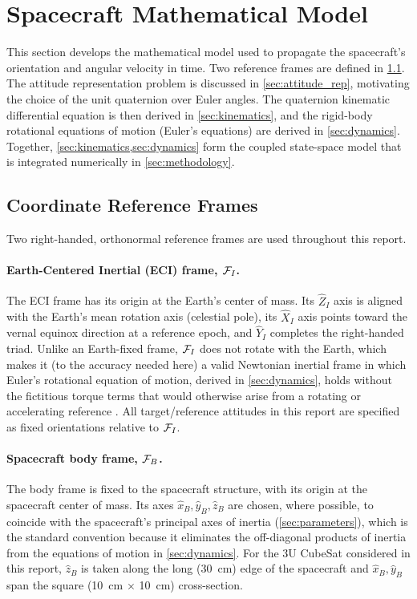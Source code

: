 \section{Spacecraft Mathematical Model}
\label{sec:math_model}

This section develops the mathematical model used to propagate the spacecraft's orientation and angular velocity in time. Two reference frames are defined in \cref{sec:frames}. The attitude representation problem is discussed in \cref{sec:attitude_rep}, motivating the choice of the unit quaternion over Euler angles. The quaternion kinematic differential equation is then derived in \cref{sec:kinematics}, and the rigid-body rotational equations of motion (Euler's equations) are derived in \cref{sec:dynamics}. Together, \cref{sec:kinematics,sec:dynamics} form the coupled state-space model that is integrated numerically in \cref{sec:methodology}.

\subsection{Coordinate Reference Frames}
\label{sec:frames}

Two right-handed, orthonormal reference frames are used throughout this report.

\paragraph{Earth-Centered Inertial (ECI) frame, $\mathcal{F}_I$.} The ECI frame has its origin at the Earth's center of mass. Its $\hat{Z}_I$ axis is aligned with the Earth's mean rotation axis (celestial pole), its $\hat{X}_I$ axis points toward the vernal equinox direction at a reference epoch, and $\hat{Y}_I$ completes the right-handed triad. Unlike an Earth-fixed frame, $\mathcal{F}_I$ does not rotate with the Earth, which makes it (to the accuracy needed here) a valid Newtonian inertial frame in which Euler's rotational equation of motion, derived in \cref{sec:dynamics}, holds without the fictitious torque terms that would otherwise arise from a rotating or accelerating reference \cite{curtis2020, wertz1978}. All target/reference attitudes in this report are specified as fixed orientations relative to $\mathcal{F}_I$.

\paragraph{Spacecraft body frame, $\mathcal{F}_B$.} The body frame is fixed to the spacecraft structure, with its origin at the spacecraft center of mass. Its axes $\hat{x}_B, \hat{y}_B, \hat{z}_B$ are chosen, where possible, to coincide with the spacecraft's principal axes of inertia (\cref{sec:parameters}), which is the standard convention because it eliminates the off-diagonal products of inertia from the equations of motion in \cref{sec:dynamics}. For the 3U CubeSat considered in this report, $\hat{z}_B$ is taken along the long (\SI{30}{\centi\meter}) edge of the spacecraft and $\hat{x}_B, \hat{y}_B$ span the square (\SI{10}{\centi\meter} $\times$ \SI{10}{\centi\meter}) cross-section.

